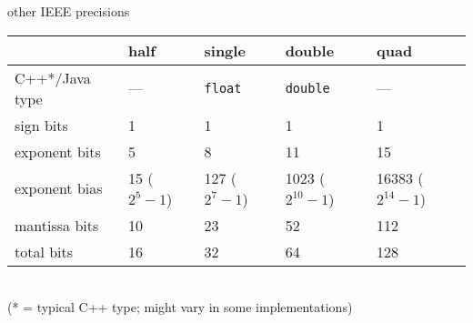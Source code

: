 \begin{frame}{other IEEE precisions}
\begin{tabular}{l|llll}
~ & half & single & double & quad \\ \hline
C++*/Java type& --- & \texttt{float} & \texttt{double} & ---\\
sign bits & 1 & 1 & 1 & 1\\
exponent bits & 5 & 8 & 11 & 15 \\
    exponent bias & 15 {\small ($2^5-1$)} & 127 {\small ($2^7-1$)} & 1023 {\small ($2^{10}-1$)} & 16383 {\small ($2^{14}-1$)}\\
mantissa bits & 10 & 23 & 52 & 112\\
total bits & 16 & 32 & 64 & 128\\
\end{tabular}\\
    {\scriptsize (* = typical C++ type; might vary in some implementations)}
\end{frame}


